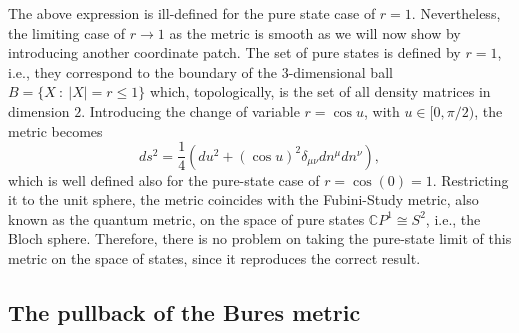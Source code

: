 The above expression is ill-defined for the pure state case of $r=1$. Nevertheless, the limiting case of $r\to 1$ as the metric is smooth as we will now show by introducing another coordinate patch. The set of pure states is defined by $r=1$, i.e., they correspond to the boundary of the $3$-dimensional ball $B=\{X \ :\  |X| = r \leq 1\}$ which, topologically, is the set of all density matrices in dimension $2$. Introducing the change of variable $r = \cos u$, with $u \in [0,\pi /2)$, the metric becomes 
\begin{equation*}
ds^2=\frac{1}{4}\left(du^2 + (\cos u)^2\delta_{\mu\nu}dn^{\mu}dn^{\nu}\right),
\end{equation*}
which is well defined also for the pure-state case of $r=\cos(0) = 1$. Restricting it to the unit sphere, the metric coincides with the Fubini-Study metric, also known as the quantum metric, on the space of pure states $\mathbb{C}P^1\cong S^2$, i.e., the Bloch sphere. Therefore, there is no problem on taking the pure-state limit of this metric on the space of states, since it reproduces the correct result.

\subsection*{The pullback of the Bures metric}


